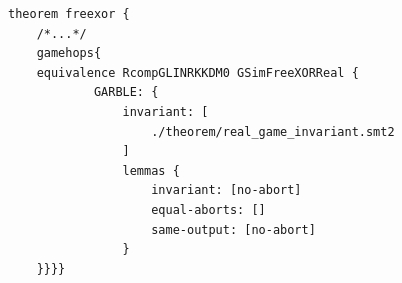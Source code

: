 \begin{longlisting}
\begin{verbatim}
theorem freexor {
    /*...*/
    gamehops{
    equivalence RcompGLINRKKDM0 GSimFreeXORReal {
            GARBLE: {
                invariant: [
                    ./theorem/real_game_invariant.smt2
                ]
                lemmas {
                    invariant: [no-abort]
                    equal-aborts: []
                    same-output: [no-abort]
                }
    }}}}
\end{verbatim}
\caption{Equivalence game hop in the theorem}
\label{lst:domino-theorem-equivalence-gamehop}
\end{longlisting}
